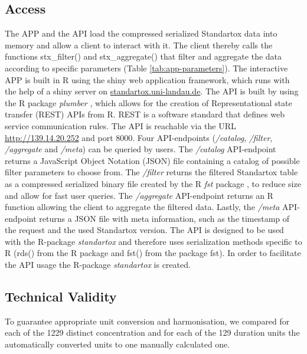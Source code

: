 \subsection{Access}
The APP and the API load the compressed serialized Standartox data into memory and allow a client to interact with it. The client thereby calls the functions stx\_filter() and stx\_aggregate() that filter and aggregate the data according to specific parameters (Table \ref{tab:app-parameters}). The interactive APP is built in R using the shiny web application framework, which runs with the help of a shiny server \citep{chang_shiny_2018} on \url{standartox.uni-landau.de}. The API is built by using the R package \textit{plumber} \citep{trestletechnologyllc_plumber_2018}, which allows for the creation of Representational state transfer (REST) APIs from R. REST is a software standard that defines web service communication rules. The API is reachable via the URL \url{http://139.14.20.252} and port 8000. Four API-endpoints (\textit{/catalog}, \textit{/filter}, \textit{/aggregate} and \textit{/meta}) can be queried by users. The \textit{/catalog} API-endpoint returns a JavaScript Object Notation (JSON) file containing a catalog of possible filter parameters to choose from. The \textit{/filter} returns the filtered Standartox table as a compressed serialized binary file created by the R \textit{fst} package \citep{klik_fst_2019}, to reduce size and allow for fast user queries. The \textit{/aggregate} API-endpoint returns an R function allowing the client to aggregate the filtered data. Lastly, the \textit{/meta} API-endpoint returns a JSON file with meta information, such as the timestamp of the request and the used Standartox version. The API is designed to be used with the R-package \textit{standartox} and therefore uses serialization methods specific to R (rds() from the R package  and fst() from the package fst). In order to facilitate the API usage the R-package \textit{standartox} is created.

\subsection{Technical Validity}
To guarantee appropriate unit conversion and harmonisation, we compared for each of the 1229 distinct concentration and for each of the 129 duration units the automatically converted units to one manually calculated one.

